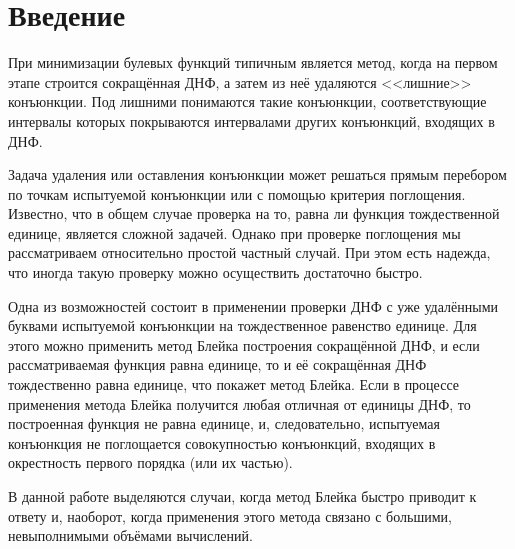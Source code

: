 \documentclass[12pt,a4paper,oneside,fleqn,leqno]{article}
\theoremstyle{definition}
\begin{document}
\newpage
\renewcommand{\contentsname}{Содержание}
\tableofcontents

\newpage
\begin{abstract}
    
\end{abstract}

\newpage
\section*{Введение}
	При минимизации булевых функций типичным является метод, когда на первом этапе строится сокращённая ДНФ, а затем из неё удаляются <<лишние>> конъюнкции. Под лишними понимаются такие конъюнкции, соответствующие интервалы которых покрываются интервалами других конъюнкций, входящих в ДНФ.\par
	Задача удаления или оставления конъюнкции может решаться прямым перебором по точкам испытуемой конъюнкции или с помощью критерия поглощения. Известно, что в общем случае проверка на то, равна ли функция тождественной единице, является сложной задачей. Однако при проверке поглощения мы рассматриваем относительно простой частный случай. При этом есть надежда, что иногда такую проверку можно осуществить достаточно быстро.\par
	Одна из возможностей состоит в применении проверки ДНФ с уже удалёнными буквами испытуемой конъюнкции на тождественное равенство единице. Для этого можно применить метод Блейка построения сокращённой ДНФ, и если рассматриваемая функция равна единице, то и её сокращённая ДНФ тождественно равна единице, что покажет метод Блейка. Если в процессе применения метода Блейка получится любая отличная от единицы ДНФ, то построенная функция не равна единице, и, следовательно, испытуемая конъюнкция не поглощается совокупностью конъюнкций, входящих в окрестность первого порядка (или их частью).\par
	В данной работе выделяются случаи, когда метод Блейка быстро приводит к ответу и, наоборот, когда применения этого метода связано с большими, невыполнимыми объёмами вычислений.
\end{document}
